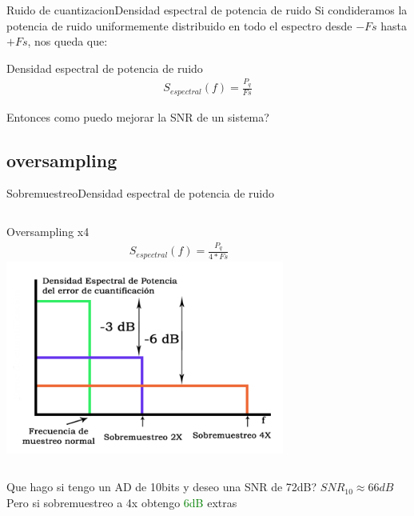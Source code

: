  \begin{frame}{Ruido de cuantizacion}{Densidad espectral de potencia de ruido}
    Si condideramos la potencia de ruido uniformemente distribuido en todo el espectro desde $-Fs$ hasta $+Fs$, nos queda que:
    \begin{block}{Densidad espectral de potencia de ruido}
       \begin{align*}
          S_{espectral}(f) = \frac{P_q}{Fs}
       \end{align*}
    \end{block}
    Entonces como puedo mejorar la SNR de un sistema?
    \vfill
 \end{frame}
 \subsection{oversampling}
 \begin{frame}{Sobremuestreo}{Densidad espectral de potencia de ruido}
    \begin{columns}[onlytextwidth]
       Oversampling x4
       \begin{align*}
          S_{espectral}(f) = \frac{P_q}{4*Fs}
       \end{align*}
       \center\includegraphics[width=0.8\textwidth]{1_clase/oversampling}
    \end{columns}
    \vfill
    Que hago si tengo un AD de 10bits y deseo una SNR de 72dB?
    $SNR_{10}\approx 66dB$
    Pero si sobremuestreo a 4x obtengo \textcolor{green}{6dB} extras
 \end{frame}

